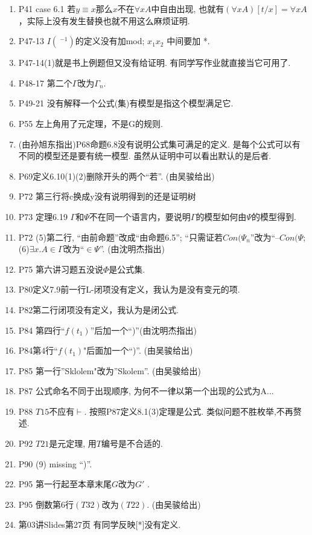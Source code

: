 \documentclass{article}
\begin{document}
\begin{enumerate}
\item P41 case 6.1 若$y\equiv x$那么$x$不在$\forall xA$中自由出现, 也就有$(\forall xA)[t/x] = \forall xA$，实际上没有发生替换也就不用这么麻烦证明. 
\item P47-13 $I(~^{-1})$的定义没有加mod; $x_1x_2$ 中间要加 *. 
\item P47-14(1)就是书上例题但又没有给证明. 有同学写作业就直接当它可用了. 
\item P48-17 第二个$\Gamma$改为$\Gamma_n$. 
\item P49-21 没有解释一个公式(集)有模型是指这个模型满足它. 
\item P55 左上角用了元定理，不是G的规则. 
\item (由孙旭东指出)P68命题6.8没有说明公式集可满足的定义. 是每个公式可以有不同的模型还是要有统一模型. 虽然从证明中可以看出默认的是后者. 
\item P69定义6.10(1)(2)删除开头的两个``若''. (由吴骏给出)
\item P72 第三行将c换成y没有说明得到的还是证明树
\item P73 定理6.19 $\Gamma$和$\Psi$不在同一个语言内，要说明$\Gamma$的模型如何由$\Psi$的模型得到. 
\item P72 (5)第二行, ``由前命题''改成``由命题6.5''; ``只需证若$Con(\Psi_n$''改为``--$Con(\Psi$; (6)$\exists x.A \in \Gamma$改为``$\in \Psi$''. (由沈明杰指出)
\item P75 第六讲习题五没说$\Phi$是公式集. 
\item P80定义7.9前一行L-闭项没有定义，我认为是没有变元的项. 
\item P82第二行闭项没有定义，我认为是闭公式. 
\item P84 第四行``$f(t_1)$''后加一个``)''(由沈明杰指出)
\item P84第4行``$f(t_1)$"后面加一个``)''. (由吴骏给出)
\item P85 第一行''Sklolem"改为''Skolem''. (由吴骏给出)
\item P87 公式命名不同于出现顺序, 为何不一律以第一个出现的公式为A...
\item P88 $T15$不应有$\vdash$. 按照P87定义8.1(3)定理是公式. 类似问题不胜枚举,不再赘述. 
\item P92 $T21$是元定理, 用$T$编号是不合适的. 
\item P90 (9) missing ``)''. 
\item P95 第一行起至本章末尾$G$改为$G'$ . 
\item P95 倒数第6行$(T32)$改为$(T22)$. (由吴骏给出)
\item 第03讲Slides第27页 有同学反映[*]没有定义. 

\end{enumerate}
\end{document}
